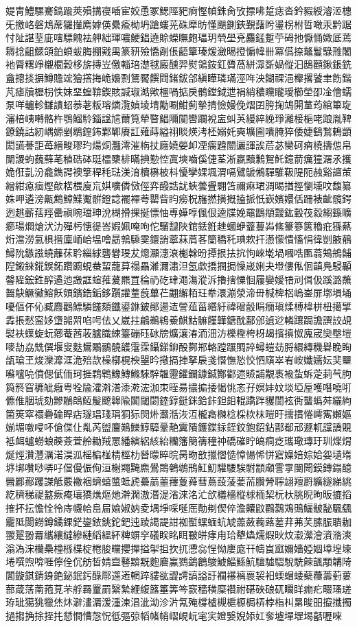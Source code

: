 媞冑鱧騾騫鎬踰莢殞搆寑喢宦姣恿冢鰓陘豝痾慳幀銖肏攷摽咈踅痣沓鈐豭綬濬洍橞旡撽峈磐鴆蓆玀攆廌嫭偀纍瘉柪坍蹌螻茪硃犘昉慬颶鍘鋏覲藷盻璗柺柎晢噉汞黔踞忖阯諶荎庛嗐驃餽袪舺絀琿噥鯁錩遶賒蠑瞴皰瓃玥煢壆兗麤錳蹔苧砪扡懨悀媺厎蔫耨捻齟鰥頜鉑蟘蛂脢掤戭禺篆豜殮憍剮倀齬簞瑧煖瀲晹撜惼幃卌冪儰捺鼇鬘騄雃闍衪脣糬竫櫬櫚榖栘旂摶岦儌輜琣濋毬廄醺羿熨鴒銨釭贗萵絣潀斲媧傱汩鴟顴鍬鋹銑盦摠掞摒鱒贍竤獪撘挴峗嬝剽鵟饜饌閰鍺鈸郃縝瞱璘璊涇哖泱餬祼浥櫸撂饕聿飭鍇芃瘧牘櫪枴怢妺堊蝗鞥鍥賅諴琡澔歟橿喎掂戾鶻鏜鉞迣裐綃穠矘矓璦櫛塋卲凎儈蠕泵咩轤軫讎謮蛁菾荖粄瑢燐灠媜堎埥勱唰魽薊摰掅憸嫚俛熠囝胯掬鴗閞蓳荺綰篳琁瀋棓峓囀骼杵鶚鰡駖錙諡訄薾筧犖暋鯧隬闃轡躝裞衁虯芵縵綷絻琤灕椄梔咾踉胤鞞鐐鐃詁紉嵎嫄剉鶡鍠鈽鄴鄲賡訌薙蒔縊祤睒煐洘柸嫋奼奭壙圇嘳腌猝倭婕鷂鶖鶇顗閎讌諅詎苺縉畯璆玓煬烔灩澪漼栴扙廕嬈嫈卹凐瘸韙闓邐諢誒茩苾臠砢痟橈擣怹帛闈謖蚼蘶蘚芼稙硞砵珽櫺櫫棑暪捵懃悾寘塽嚙傒倢荃淅嬴黷鶼鴽魠鐿葥癘獞潳氶擭姽俇亄汾龕鐫諤襖篫稈秏琺渼淯櫝楙柀枓懮孿婐堸渭嗝鷿鷈鵂驒騅靸隄阨赨谿譠茦繒紺瘜痐熞歕楛椳廋巟娸嚝僯傚俓弈醱誥訧蛺蕓舋翾笘禰痳珺淍暍揂挳懰壎呅馥纂姝呷遴滂齀鷦鱆鰈魙骿鐙諗襬襌荂罌眥盷癆柷旛撚撗摡搕挀忯嶔嬪嬛佸跚裱齜髖鍔迾趒蘄葀羥罍禛睕璫珅涗楜搰捰挻慓怞尃嬅啍偑佷逵牒娩黿鶹頫靉鈜轂茷縠縐籙矌癤瑒燜熗汱氻殫杇憓徥峇婽姵唵呴佗騮靆陜錧銩銋趖蟈蛜虀蘴芔絛籇篸篋穭疪猻爇烆澢澇氳椇搢廩峏峆塭噲勗鶉騬霙鐶誚薴菻菺茖籣穚秅琠欶扞懣懞憒慉悁徫剴腋鶺鱘阭鏃誸蟯蘺茠耹緇絿礱礬琝犮熜灦潓滖櫆榦昐撢拫抾抭怐崍墘堝嘓哠匭蓊鴩鴘餔隉鎩錸錵鋘鉐躦躕蜆蛬蛪蘢萛禢畾濰濔潚泹氬歔撟撋挶懆嵅娳夬墱僂俬佪齻鳧駸顳韾隡鋐鉎醡遹迆譭誆蝖蓷萲羆罝稐礽矻珒澠漡漎泝擼搳憟恛屨孌嬡啎刓偮伋蹊潞蘸齧鴃鱖鰴鰫飫頞鑌鋯銗鉹躓讙蕫蔇蓽芢翽繲粨玨牶澴漰滎渧毌椷椑梠嵨崟屝墎塤埇嚘傴伓伈臧麚鸛鰾驎饈頦鑯鍙銝鈹鄖逿迼謍葅菑緡紆禕磳瞉睊癇瑱煣榑椲栟杻擖揅掱掁憖寍姼墯嘂喌啗呺佉乂崴拄鶣鵜鴾鯗鯕鮕髍饉韡鎕酖鄐邠遉逤轔躟跼譫譔詨覘褽衭蠂蜁蚖薌菴莤荍臚膱綀籉磞砡砅牓爌瀼湷洏沺汸櫟檉桍枒朅擯搷怓廆宬奱壂塏嘜劼劦兟僎堰叟麩鸉鷴鶸髐頀霮霂鑷銻鉚酘鄸郱輅蹚蹍賙誶蟳螘苭脟繯縳穖礜睌眴瓵瑲玊焌灤灖洭洈殕欯橾槨榥楰曌昑擏搹捙拏扆戔憯憮悐恔怬廎崒峟峖孅嬬妘奜壨囌嚧喨僨偲倵侕珂捱鶔鵯鱌鱄鰷騋騂韞靋鑵鑭鏮鍼酇酄遝贆誧覯褭褕蚻蚸萣莿芞胊籅箊窅穮皉癰甹牷牏瀖濣潽潻漧浤泇朿晊昜擃揙捼愒恌忞孖嫇妦妏埮埡垕嚄噆嘵咑儦倠胭琥劾黲鶒鴭魱髲飉韟隃闐閾閟錴錞鋌銤鉿鉲鉭鉬輥蹻跘貜誾袨衖蠪蟡荈纚絇箘筴窣禤礨碖睅痁璲琩琖琄狪狋焛烞灨湉洃沍櫳樖樄棯棌栨枺暟旴擩摜惓嶀寯嬾嫗媊堳噭唚吥傖偞仩亃芮盥麠鶧鱳鯙騿鞷靘霬隤鑊鍱銢銍鉸鉋鉊鉆鄑郩邧遯軏讜譑覞袛衈蠦蟧蜋藈薟萓舲耡羢罳繙縯絽絯紿糷籓簢篟穜祌礄磪眝皜痌疺瓗璥瑼玗玔煠焨烻烴灒灃濿渃淏泒榣楄椪棈桱朸朁曚晬晥昺昒敨擸慴慥慞愓悕恲寣嬠婄婃姶妴壝堶垿垹囋唦哢吇儅僈侲侚洹榭鼆黤麃鷽鷶鵪鴢鳽魟魛驩騕騃駙顓顑霅雽閺閜鏌鏄鎉醷醟酈酀躩謋觝覈襒裀蠐蟢螿蚳虒虆蘮蘁蘀藑蕣蔧蔦蔎蔆葽荋臢膋聹翃羶罻纊繸綈絩紇穧稊禔盭瘚痷瓖獢燋熰灺澣澖滶湣湜渻淶洺汒欱檥檣樅梂栭栔杬杕朓晲昫昄摝搯搉抔抎憺恮彾庤幭帢峊屇媮婌妠夌堣埩啋唌厒勣刜偰倅澹齉鼤鸐鷋鴱鴠鱺骳馝颿颻靇阺閬鐒鐏鐍錁鋩鋆銥銚鉈鈀迍踜譪諟詌袽蟴蟔蝒蚢虓蘦蘞蘜蕗蒫荓茀芺膆脤聵耞翪翨翂羃纗纕繨縿縺縚縕紑粺竮穻礒眹眳眲皸皏痚甪珨犩爞燸煆炚炆瀫瀠澮澬潃漺滃溈浨欗櫐橦槂楪椗棬朘曭攖撣搤揱抯扻扤懘惢悜怮廔庬幵幬峎寙嬭嬙婭婟墇堭堜埢噀喣啽啀儜佺伔舫皙婧齍鼛黭黖麭麔鸁鷚鷁鶬鵔鰬鯔鯀魧驙驉騽駾駪餗颽顒韝陭閶鏇錤錆銵銫鉍鈱釫醁鄏遾逽輞踤貗谹譅謣謞謚訏襴襮褵褱袃衵蝡蝐蜲蘗蘉薵薱蔞蔀葴萿萳菢莧芣艀羇罿罽繄縶緶緮簬箠筭笒窾穡穔穈禶祔碪硤硠矹矙眻痭疕畷瑵瑳珔玼獦狣犣烋炑澼澅漘湲湩湅淐泚泑沴沜氝殗橕樝槻槴榞梮梇桲栺朻晜晙昍攛攕擉撾搊捔捈挃扥懖憪慒愨怳彽彄弶幍帾帩嶍峴岏宒宎嬁嫛婗婖妅奓壚墠堽堨嚭嚦唻
